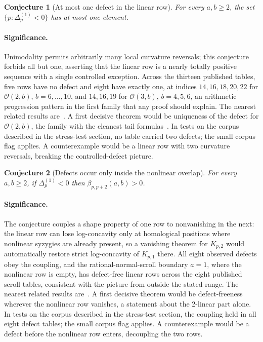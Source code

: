 \documentclass[11pt]{article}
\newtheorem{conjecture}{Conjecture}
\theoremstyle{definition}
\begin{document}
\begin{conjecture}[At most one defect in the linear row]\label{ae9}
For every $a,b\ge2$, the set $\{p:\Delta^{(1)}_p<0\}$ has at most one element.
\end{conjecture}

\paragraph{Significance.}
Unimodality permits arbitrarily many local curvature reversals; this conjecture forbids all but one, asserting that the linear row is a nearly totally positive sequence with a single controlled exception.  Across the thirteen published tables, five rows have no defect and eight have exactly one, at indices $14,16,18,20,22$ for $\mathcal O(2,b)$, $b=6,\ldots,10$, and $14,16,19$ for $\mathcal O(3,b)$, $b=4,5,6$, an arithmetic progression pattern in the first family that any proof should explain.  The nearest related results are~\cite{BCEGLY22,Park25}.  A first decisive theorem would be uniqueness of the defect for $\mathcal O(2,b)$, the family with the cleanest tail formulas~\cite{Lem21}.  In tests on the corpus described in the stress-test section, no table carried two defects; the small corpus flag applies.  A counterexample would be a linear row with two curvature reversals, breaking the controlled-defect picture.

\begin{conjecture}[Defects occur only inside the nonlinear overlap]\label{ae10}
For every $a,b\ge2$, if $\Delta^{(1)}_p<0$ then $\beta_{p,p+2}(a,b)>0$.
\end{conjecture}

\paragraph{Significance.}
The conjecture couples a shape property of one row to nonvanishing in the next: the linear row can lose log-concavity only at homological positions where nonlinear syzygies are already present, so a vanishing theorem for $K_{p,2}$ would automatically restore strict log-concavity of $K_{p,1}$ there.  All eight observed defects obey the coupling, and the rational-normal-scroll boundary $a=1$, where the nonlinear row is empty, has defect-free linear rows across the eight published scroll tables, consistent with the picture from outside the stated range.  The nearest related results are~\cite{BCEGLY22,EEL15}.  A first decisive theorem would be defect-freeness wherever the nonlinear row vanishes, a statement about the 2-linear part alone.  In tests on the corpus described in the stress-test section, the coupling held in all eight defect tables; the small corpus flag applies.  A counterexample would be a defect before the nonlinear row enters, decoupling the two rows.
\end{document}
